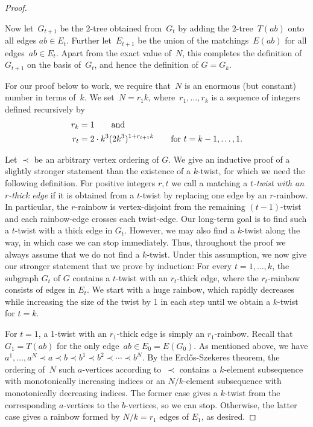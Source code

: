 \documentclass{article}
\begin{document}
\begin{proof}
\begin{subproof}
    Now let~$G_{t+1}$ be the $2$-tree obtained from~$G_t$ by adding the $2$-tree~$T(ab)$ onto all edges $ab \in E_t$.
    Further let~$E_{t+1}$ be the union of the matchings~$E(ab)$ for all edges~$ab \in E_t$.
    Apart from the exact value of~$N$, this completes the definition of~$G_{t+1}$ on the basis of~$G_t$, and hence the definition of $G = G_k$.

    For our proof below to work, we require that~$N$ is an enormous (but constant) number in terms of~$k$.
    We set~$N = r_1k$, where~$r_1, \ldots, r_k$ is a sequence of integers defined recursively by
    \begin{align*}
        r_k &= 1 \qquad \text{and} \\
        r_t &= 2 \cdot k^3 (2 k^3)^{1 + r_{t+1} k} \qquad \text{for $t = k-1, \ldots, 1$}
        \text{.}\qedhere 
    \end{align*}
	\end{subproof}

	\begin{subproof}
    Let $ \prec $ be an arbitrary vertex ordering of $ G $.
    We give an inductive proof of a slightly stronger statement than the existence of a $ k $-twist, for which we need the following definition.
    For positive integers $ r, t $ we call a matching a \emph{$ t $-twist with an $ r $-thick edge} if it is obtained from a $ t $-twist by replacing one edge by an $ r $-rainbow.
    In particular, the $ r $-rainbow is vertex-disjoint from the remaining $ (t-1) $-twist and each rainbow-edge crosses each twist-edge.
    Our long-term goal is to find such a $ t $-twist with a thick edge in $ G_t $. 
    However, we may also find a $ k $-twist along the way, in which case we can stop immediately.
    Thus, throughout the proof we always assume that we do not find a $ k $-twist.
    Under this assumption, we now give our stronger statement that we prove by induction:
    For every $ t = 1, \dots, k $, the subgraph $ G_t $ of $ G $ contains a $ t $-twist with an $ r_t $-thick edge, where the $ r_t $-rainbow consists of edges in $E_t$.
    We start with a huge rainbow, which rapidly decreases while increasing the size of the twist by 1 in each step until we obtain a $ k $-twist for $ t = k $.
    \end{subproof}
    
    For $ t = 1 $, a 1-twist with an $ r_1 $-thick edge is simply an $ r_1 $-rainbow.
    Recall that~$G_1 = T(ab)$ for the only edge~$ab \in E_0 = E(G_0)$.
    As mentioned above, we have $a^1, \ldots, a^N \prec a \prec b \prec b^1 \prec b^2 \prec \cdots \prec b^N$.
    By the Erd\H{o}s-Szekeres theorem, the ordering of~$N$ such $a$-vertices according to~$\prec$ contains a $k$-element subsequence with monotonically increasing indices or an $N/k$-element subsequence with monotonically decreasing indices.
    The former case gives a $k$-twist from the corresponding $a$-vertices to the $b$-vertices, so we can stop.
    Otherwise, the latter case gives a rainbow formed by $N/k = r_1$ edges of $ E_1 $, as desired.
    

\end{proof}
\end{document}
